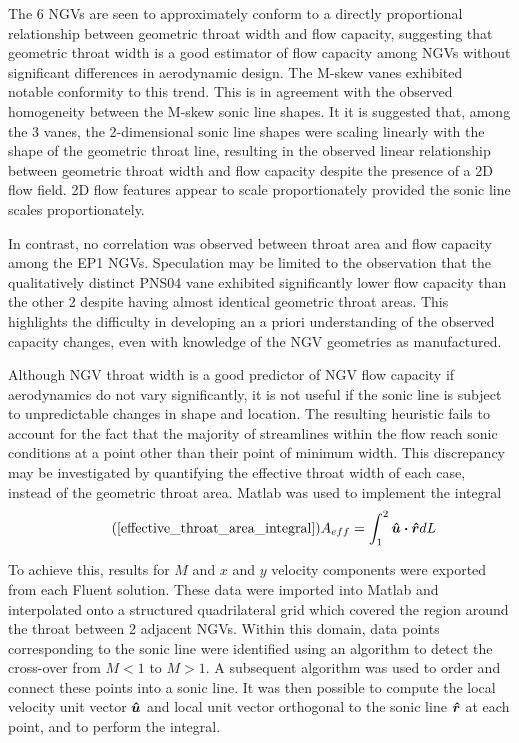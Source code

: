 \documentclass[a4paper, 11pt, oneside]{report}
\begin{document}
The 6 NGVs are seen to approximately conform to a directly proportional relationship between geometric throat width and flow capacity, suggesting that geometric throat width is a good estimator of flow capacity among NGVs without significant differences in aerodynamic design. The M-skew vanes exhibited notable conformity to this trend. This is in agreement with the observed homogeneity between the M-skew sonic line shapes. It it is suggested that, among the 3 vanes, the 2-dimensional sonic line shapes were scaling linearly with the shape of the geometric throat line, resulting in the observed linear relationship between geometric throat width and flow capacity despite the presence of a 2D flow field. 2D flow features appear to scale proportionately provided the sonic line scales proportionately.

In contrast, no correlation was observed between throat area and flow capacity among the EP1 NGVs. Speculation may be limited to the observation that the qualitatively distinct PNS04 vane exhibited significantly lower flow capacity than the other 2 despite having almost identical geometric throat areas. This highlights the difficulty in developing an a priori understanding of the observed capacity changes, even with knowledge of the NGV geometries as manufactured.

Although NGV throat width is a good predictor of NGV flow capacity if aerodynamics do not vary significantly, it is not useful if the sonic line is subject to unpredictable changes in shape and location. The resulting heuristic fails to account for the fact that the majority of streamlines within the flow reach sonic conditions at a point other than their point of minimum width. This discrepancy may be investigated by quantifying the effective throat width of each case, instead of the geometric throat area. Matlab was used to implement the integral
\begin{equation}\tag{\ref{effective_throat_area_integral}}
	A_{eff} = 
	\int_{1}^2 \vu*{u} \vdot \vu*{r} dL
\end{equation}

\newpage
To achieve this, results for $M$ and $x$ and $y$ velocity components were exported from each Fluent solution. These data were imported into Matlab and interpolated onto a structured quadrilateral grid which covered the region around the throat between 2 adjacent NGVs. Within this domain, data points corresponding to the sonic line were identified using an algorithm to detect the cross-over from $M<1$ to $M>1$. A subsequent algorithm was used to order and connect these points into a sonic line. It was then possible to compute the local velocity unit vector $\vu*{u}$ and local unit vector orthogonal to the sonic line $\vu*{r}$ at each point, and to perform the integral. 
\end{document}
